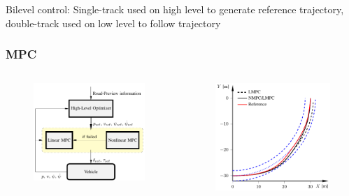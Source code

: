 \documentclass[]{beamer}
\begin{document}
\begin{frame}
Bilevel control: Single-track used on high level to generate reference trajectory, double-track used on low level to follow trajectory
\frametitle{MPC}
\begin{columns}
\begin{figure}[ht]
\centering
\includegraphics[width=\linewidth]{structure.pdf}
\end{figure}

\begin{figure}[ht]
\centering
\includegraphics[width=\linewidth]{mpcxy.pdf}
\end{figure}
\end{columns}
\end{frame}
\end{document}
